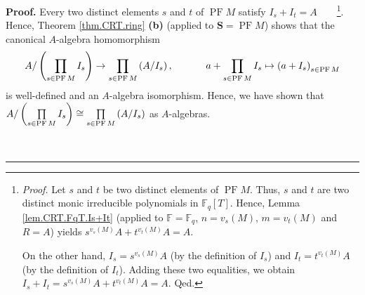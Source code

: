 \documentclass[numbers=enddot,12pt,final,onecolumn,notitlepage]{scrartcl}%
\theoremstyle{definition}
\newenvironment{proof}[1][Proof]{\noindent\textbf{#1.} }{\ \rule{0.5em}{0.5em}}
\let\prodnonlimits\prod
\renewcommand{\prod}{\prodnonlimits\limits}
\begin{document}
\begin{proof}
Every two distinct elements $s$ and $t$ of $\operatorname*{PF}M$ satisfy
$I_{s}+I_{t}=A$\ \ \ \ \footnote{\textit{Proof.} Let $s$ and $t$ be two
distinct elements of $\operatorname*{PF}M$. Thus, $s$ and $t$ are two distinct
monic irreducible polynomials in $\mathbb{F}_{q}\left[  T\right]  $. Hence,
Lemma \ref{lem.CRT.FqT.Is+It} (applied to $\mathbb{F}=\mathbb{F}_{q}$,
$n=v_{s}\left(  M\right)  $, $m=v_{t}\left(  M\right)  $ and $R=A$) yields
$s^{v_{s}\left(  M\right)  }A+t^{v_{t}\left(  M\right)  }A=A$.
\par
On the other hand, $I_{s}=s^{v_{s}\left(  M\right)  }A$ (by the definition of
$I_{s}$) and $I_{t}=t^{v_{t}\left(  M\right)  }A$ (by the definition of
$I_{t}$). Adding these two equalities, we obtain $I_{s}+I_{t}=s^{v_{s}\left(
M\right)  }A+t^{v_{t}\left(  M\right)  }A=A$. Qed.}. Hence, Theorem
\ref{thm.CRT.ring} \textbf{(b)} (applied to $\mathbf{S}=\operatorname*{PF}M$)
shows that the canonical $A$-algebra homomorphism
\[
A/\left(  \prod\limits_{s\in\operatorname*{PF}M}I_{s}\right)  \rightarrow
\prod\limits_{s\in\operatorname*{PF}M}\left(  A/I_{s}\right)
,\ \ \ \ \ \ \ \ \ \ a+\prod\limits_{s\in\operatorname*{PF}M}I_{s}%
\mapsto\left(  a+I_{s}\right)  _{s\in\operatorname*{PF}M}%
\]
is well-defined and an $A$-algebra isomorphism. Hence, we have shown that
$A/\left(  \prod\limits_{s\in\operatorname*{PF}M}I_{s}\right)  \cong%
\prod\limits_{s\in\operatorname*{PF}M}\left(  A/I_{s}\right)  $ as $A$-algebras.


\end{proof}
\end{document}
